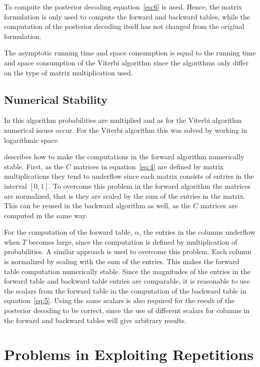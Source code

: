 To compute the posterior decoding equation~\eqref{eq:6} is used. Hence, the
matrix formulation is only used to compute the forward and backward tables,
while the computation of the posterior decoding itself has not changed from the
original formulation.

The asymptotic running time and space consumption is equal to the running time
and space consumption of the Viterbi algorithm since the algorithms only
differ on the type of matrix multiplication used.

\subsection{Numerical Stability}

In this algorithm probabilities are multiplied and as for the Viterbi algorithm
numerical issues occur. For the Viterbi algorithm this was solved by working in
logarithmic space.

\citet{sand2013ziphmmlib} describes how to make the computations in the forward
algorithm numerically stable. First, as the $C$ matrices in
equation~\eqref{eq:4} are defined by matrix multiplications they tend to
underflow since each matrix consists of entries in the interval $[0, 1]$. To
overcome this problem in the forward algorithm the matrices are normalized,
that is they are scaled by the sum of the entries in the matrix. This can be
reused in the backward algorithm as well, as the $C$ matrices are computed in
the same way.

For the computation of the forward table, $\alpha$, the entries in the columns underflow when
$T$ becomes large, since the computation is defined by multiplication of
probabilities. A similar approach is used to overcome this problem. Each column
is normalized by scaling with the sum of the entries. This makes the forward
table computation numerically stable. Since the magnitudes of the entries in
the forward table and backward table entries are comparable, it is reasonable
to use the scalars from the forward table in the computation of the backward
table in equation~\eqref{eq:5}. Using the same scalars is also required for the
result of the posterior decoding to be correct, since the use of different
scalars for columns in the forward and backward tables will give arbitrary
results.



\section{Problems in Exploiting Repetitions}
\label{sec:probl-expl-repet}

